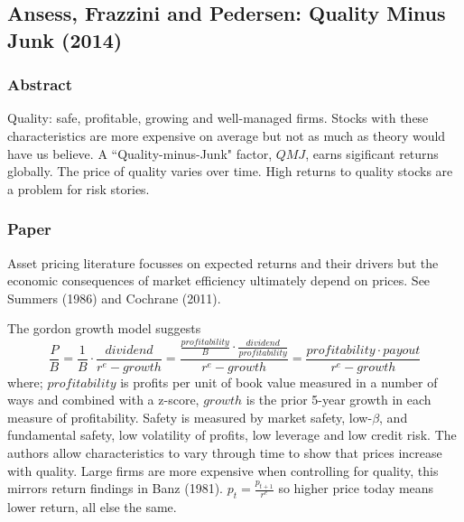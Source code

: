 \subsection[Asnsess, Frazzini and Pedersen, 2014]{Ansess, Frazzini and Pedersen: Quality Minus Junk (2014)\cite{asness2014quality}}

\subsubsection{Abstract}

Quality: safe, profitable, growing and well-managed firms. Stocks with these
characteristics are more expensive on average but not as much as theory would have us
believe. A ``Quality-minus-Junk" factor, $QMJ$, earns sigificant returns globally. The
price of quality varies over time. High returns to quality stocks are a problem for risk
stories.

\subsubsection{Paper}

Asset pricing literature focusses on expected returns and their drivers but the economic
consequences of market efficiency ultimately depend on prices. See Summers
(1986)\cite{summers1986does} and Cochrane (2011)\cite{cochrane2011presidential}.

The gordon growth model suggests
\[
\frac{P}{B}=
\frac{1}{B}\cdot\frac{dividend}{r^e-growth}=
\frac{\frac{profitability}{B}\cdot\frac{dividend}{profitability}}{r^e-growth}=
\frac{profitability\cdot payout}{r^e-growth}
\]
where; $profitability$ is profits per unit of book value measured in a number of ways and
combined with a z-score, $growth$ is the prior 5-year growth in each measure of
profitability. Safety is measured by market safety, low-$\beta$, and fundamental safety,
low volatility of profits, low leverage and low credit risk. The authors allow
characteristics to vary through time to show that prices increase with quality.
Large firms are more expensive when controlling for quality, this mirrors return findings
in Banz (1981). $p_t=\frac{p_{t+1}}{r^e}$ so higher price today means lower return, all
else the same.

